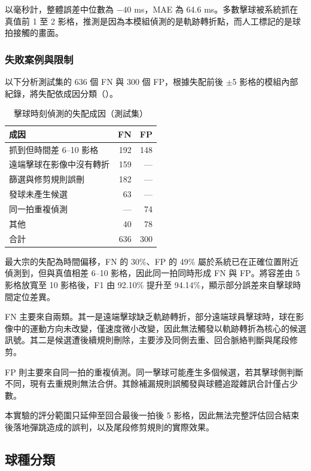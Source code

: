 以毫秒計，整體誤差中位數為 $-40$ ms，MAE 為 64.6 ms。多數擊球被系統抓在真值前 1 至 2 影格，推測是因為本模組偵測的是軌跡轉折點，而人工標記的是球拍接觸的畫面。

\subsubsection{失敗案例與限制}

以下分析測試集的 636 個 FN 與 300 個 FP，根據失配前後 $\pm$5 影格的模組內部紀錄，將失配依成因分類（）。

\begin{table}[htbp]
  \centering
  \small
  \caption{擊球時刻偵測的失配成因（測試集）}
  \label{tab:event-failures}
  \begin{tabular}{|l|r|r|}
    \hline
    成因 & FN & FP \\ \hline
    抓到但時間差 6--10 影格 & 192 & 148 \\ \hline
    遠端擊球在影像中沒有轉折 & 159 & — \\ \hline
    篩選與修剪規則誤刪 & 182 & — \\ \hline
    發球未產生候選 & 63 & — \\ \hline
    同一拍重複偵測 & — & 74 \\ \hline
    其他 & 40 & 78 \\ \hline
    合計 & 636 & 300 \\ \hline
  \end{tabular}
\end{table}

最大宗的失配為時間偏移，FN 的 30\%、FP 的 49\% 屬於系統已在正確位置附近偵測到，但與真值相差 6--10 影格，因此同一拍同時形成 FN 與 FP。將容差由 5 影格放寬至 10 影格後，F1 由 92.10\% 提升至 94.14\%，顯示部分誤差來自擊球時間定位差異。

FN 主要來自兩類。其一是遠端擊球缺乏軌跡轉折，部分遠端球員擊球時，球在影像中的運動方向未改變，僅速度微小改變，因此無法觸發以軌跡轉折為核心的候選訊號。其二是候選遭後續規則刪除，主要涉及同側去重、回合脈絡判斷與尾段修剪。

FP 則主要來自同一拍的重複偵測。同一擊球可能產生多個候選，若其擊球側判斷不同，現有去重規則無法合併。其餘補漏規則誤觸發與球體追蹤雜訊合計僅占少數。

本實驗的評分範圍只延伸至回合最後一拍後 5 影格，因此無法完整評估回合結束後落地彈跳造成的誤判，以及尾段修剪規則的實際效果。

\subsection{球種分類}
\label{sec:exp-strokes}

